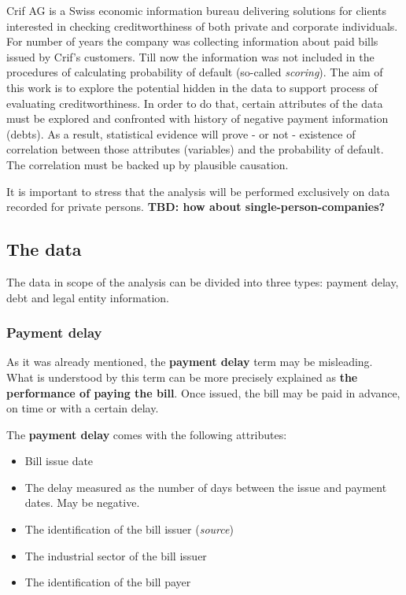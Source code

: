 \documentclass{article}
\begin{document}
Crif AG is a Swiss economic information bureau delivering solutions for clients interested in checking creditworthiness of both private and corporate individuals. For number of years the company was collecting information about paid bills issued by Crif's customers. Till now the information was not included in the procedures of calculating probability of default (so-called \textit{scoring}). The aim of this work is to explore the potential hidden in the data to support process of evaluating creditworthiness. In order to do that, certain attributes of the data must be explored and confronted with history of negative payment information (debts). As a result, statistical evidence will prove - or not - existence of correlation between those attributes (variables) and the probability of default. The correlation must be backed up by plausible causation.\par
It is important to stress that the analysis will be performed exclusively on data recorded for private persons. \textbf{TBD: how about single-person-companies?}\par

\subsection{The data}

The data in scope of the analysis can be divided into three types: payment delay, debt and legal entity information.

\subsubsection{Payment delay}

As it was already mentioned, the \textbf{payment delay} term may be misleading. What is understood by this term can be more precisely explained as \textbf{the performance of paying the bill}. Once issued, the bill may be paid in advance, on time or with a certain delay.\par
\vspace{5pt}
The \textbf{payment delay} comes with the following attributes:
\begin{itemize}
    \item Bill issue date
    \item The delay measured as the number of days between the issue and payment dates. May be negative.
    \item The identification of the bill issuer (\textit{source})
    \item The industrial sector of the bill issuer
    \item The identification of the bill payer
\end{itemize}
\end{document}
